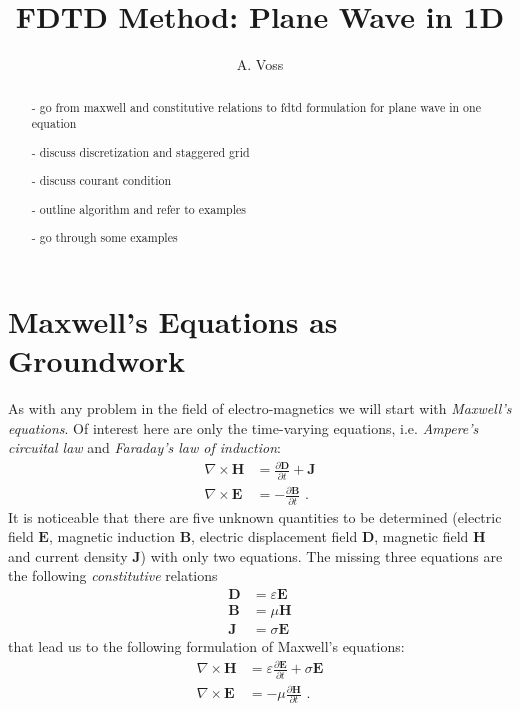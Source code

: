 \documentclass[]{report}
\title{FDTD Method: Plane Wave in 1D}
\author{A. Voss}
\begin{document}
\maketitle
\begin{abstract}
- go from maxwell and constitutive relations to fdtd formulation for plane wave in one equation

- discuss discretization and staggered grid

- discuss courant condition

- outline algorithm and refer to examples

- go through some examples
\end{abstract}

\section{Maxwell's Equations as Groundwork}
As with any problem in the field of electro-magnetics we will start with \textit{Maxwell's equations}. Of interest here are only the time-varying equations, i.e. \textit{Ampere's circuital law} and \textit{Faraday's law of induction}:
\begin{align}
	\nabla \times \mathbf{H} &= \frac{\partial \mathbf{D}}{\partial t} + \mathbf{J} \\
	\nabla \times \mathbf{E} &= -\frac{\partial \mathbf{B}}{\partial t} \text{ .}
\end{align}
It is noticeable that there are five unknown quantities to be determined (electric field \(\mathbf{E}\), magnetic induction \(\mathbf{B}\), electric displacement field \(\mathbf{D}\), magnetic field \(\mathbf{H}\) and current density \(\mathbf{J}\)) with only two equations. The missing three equations are the following \textit{constitutive} relations
\begin{align}
	\mathbf{D} &= \varepsilon \mathbf{E} \\
	\mathbf{B} &= \mu \mathbf{H} \\
	\mathbf{J} &= \sigma \mathbf{E}
\end{align}
that lead us to the following formulation of Maxwell's equations:
\begin{align}
	\nabla \times \mathbf{H} &= \varepsilon \frac{\partial \mathbf{E}}{\partial t} + \sigma \mathbf{E} \\
	\nabla \times \mathbf{E} &= -\mu \frac{\partial \mathbf{H}}{\partial t} \text{ .}
\end{align}
\end{document}
